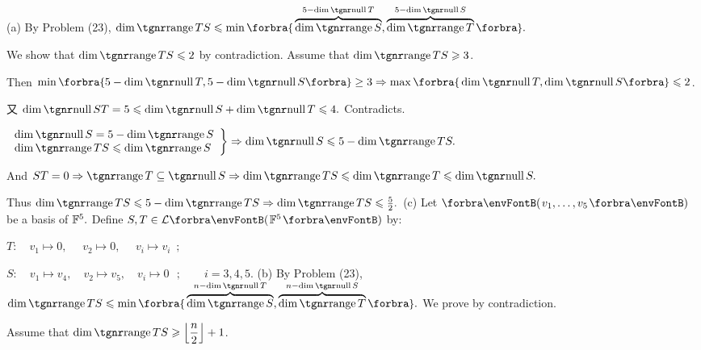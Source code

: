 \documentclass[a4paper, 11pt, UTF8]{article}
\begin{document}
\begin{large}
\par\quad
(a) By Problem (23), $\dim\range TS\leqslant\min\Bra{\overbrace{\dim \range S}^{5-\dim\null T}, \overbrace{\dim\range T}^{5-\dim\null S}}.$\par\quad\Ha
We show that $\dim\range TS\leqslant 2$ by contradiction. Assume that $\dim\range TS\geqslant 3$.\par\quad\Ha
Then $\min\Bra{5-\dim\null T,5-\dim\null S}\geq 3\Rightarrow\max\Bra{\dim\null T,\dim\null S}\leqslant 2$.\par\quad\Ha
又 $\dim\null ST=5\leqslant\dim\null S+\dim\null T\leqslant 4.$ Contradicts.\vspace{8pt}\par\quad\Ha
\Or $\MathRightBrace{l}{\dim\null S=5-\dim\range S\\ \dim\range TS\leqslant\dim\range S}\Rightarrow\dim\null S\leqslant 5-\dim\range TS.$\par\vspace{6pt}\quad\Ha
And $ST=0\Rightarrow\range T\subseteq\null S\Rightarrow\dim\range TS\leqslant\dim\range T\leqslant\dim\null S.$\par\quad\Ha
Thus $\dim\range TS\leqslant 5-\dim\range TS\Rightarrow\dim\range TS\leqslant\frac{5}{2}.$\PfEnd\vspace{10pt}\quad
(c) Let $\Par{v_1,\dots,v_5}$ be a basis of ${\mathbb{F}}^5.$ Define $S,T\in\Lm{\Fbb^5}$ by:\par\quad\Hc
\hspace{60pt}$T:\quad v_1\mapsto 0,\quad\,\, v_2\mapsto 0,\,\,\quad v_i\mapsto v_i\,\,\,;$\par\quad\Hc
\hspace{60pt}$S:\quad v_1\mapsto v_4,\quad v_2\mapsto v_5,\quad v_i\mapsto 0\,\,\,\,;\qquad i=3,4,5.$\PfEnd[-10pt]\vspace{40pt}\quad
(b) By Problem (23), $\dim\range TS\leqslant\min\Bra{\overbrace{\dim \range S}^{n-\dim\null T}, \overbrace{\dim\range T}^{n-\dim\null S}}.$ We prove by contradiction.\par\quad\Hb
Assume that $\dim\range TS\geqslant \left\lfloor\displaystyle\frac{n}{2}\right\rfloor+1$.\par\quad\Hb
{}\par\quad\Hb

\end{large}
\end{document}
